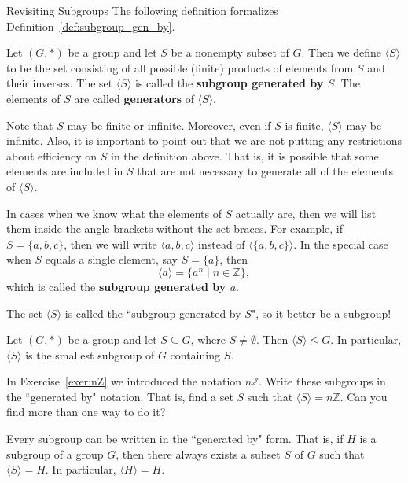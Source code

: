 \begin{section}{Revisiting Subgroups}
The following definition formalizes Definition~\ref{def:subgroup_gen_by}.

\begin{definition}
Let $(G,*)$ be a group and let $S$ be a nonempty subset of $G$.  Then we define $\langle S\rangle$ to be the set consisting of all possible (finite) products of elements from $S$ and their inverses.  The set $\langle S\rangle$ is called the \textbf{subgroup generated by $S$}.  The elements of $S$ are called \textbf{generators} of $\langle S\rangle$.
\end{definition}

Note that $S$ may be finite or infinite.  Moreover, even if $S$ is finite, $\langle S\rangle$ may be infinite.  Also, it is important to point out that we are not putting any restrictions about efficiency on $S$ in the definition above.  That is, it is possible that some elements are included in $S$ that are not necessary to generate all of the elements of $\langle S\rangle$.

In cases when we know what the elements of $S$ actually are, then we will list them inside the angle brackets without the set braces.  For example, if $S=\{a,b,c\}$, then we will write $\langle a, b, c\rangle$ instead of $\langle \{a,b,c\}\rangle$.  In the special case when $S$ equals a single element, say $S=\{a\}$, then
\[
\langle a\rangle =\{a^n\mid n\in\mathbb{Z}\},
\]
which is called the \textbf{subgroup generated by $a$}.  

The set $\langle S\rangle$ is called the ``subgroup generated by $S$", so it better be a subgroup!

\begin{theorem}\label{thm:smallest_subgroup_containing_S}
Let $(G,*)$ be a group and let $S\subseteq G$, where $S\neq \emptyset$.  Then $\langle S\rangle \leq G$.  In particular, $\langle S\rangle$ is the smallest subgroup of $G$ containing $S$.
\end{theorem}

\begin{exercise}
In Exercise~\ref{exer:nZ} we introduced the notation $n\mathbb{Z}$.  Write these subgroups in the ``generated by" notation.  That is, find a set $S$ such that $\langle S\rangle =n\mathbb{Z}$.  Can you find more than one way to do it?
\end{exercise}

Every subgroup can be written in the ``generated by" form.  That is, if $H$ is a subgroup of a group $G$, then there always exists a subset $S$ of $G$ such that $\langle S\rangle=H$.  In particular, $\langle H\rangle=H$.


\end{section}
